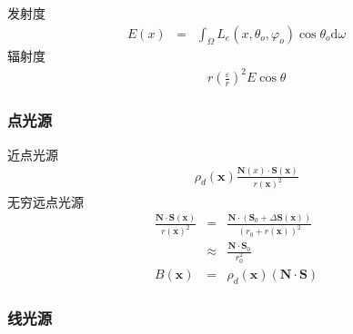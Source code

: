 \documentclass{beamer}
\newcommand{\cdummy}{\cdot}
\newcommand{\mathd}{\mathrm{d}}
\newcommand{\nospace}{}
\newcommand{\tmmathbf}[1]{\ensuremath{\boldsymbol{#1}}}
\begin{document}
{{\begin{frame}
  \frametitle{}
  
  发射度
  \begin{eqnarray*}
    E (x) & = & \int_{\Omega} L_e (x, \theta_o, \varphi_o) \cos \theta_o
    \mathd \omega
  \end{eqnarray*}
  辐射度
  \begin{eqnarray*}
    &  & r \left( \frac{\varepsilon}{r} \right)^2 E \nospace \cos \theta
  \end{eqnarray*}
  
\end{frame}

\begin{frame}
  \frametitle{点光源}
  
  近点光源
  \begin{eqnarray*}
    &  & \rho_d (\tmmathbf{x}) \frac{\tmmathbf{N} (x) \cdummy \tmmathbf{S}
    (\tmmathbf{x})}{r (\tmmathbf{x})^2}
  \end{eqnarray*}
  无穷远点光源
  \begin{eqnarray*}
    \frac{\tmmathbf{N} \cdummy \tmmathbf{S} (\tmmathbf{x})}{r
    (\tmmathbf{x})^2} & = & \frac{\tmmathbf{N} \cdummy (\tmmathbf{S}_0 +
    \Delta \tmmathbf{S} (\tmmathbf{x}))}{(r_0 + r (\tmmathbf{x}))^2}\\
    & \approx & \frac{\tmmathbf{N} \cdummy \tmmathbf{S}_0}{r_0^2}\\
    B (\tmmathbf{x}) & = & \rho_d (\tmmathbf{x}) (\tmmathbf{N} \cdummy
    \tmmathbf{S})
  \end{eqnarray*}
\end{frame}

\begin{frame}
  \frametitle{线光源}
  
\end{frame}

}}
\end{document}
